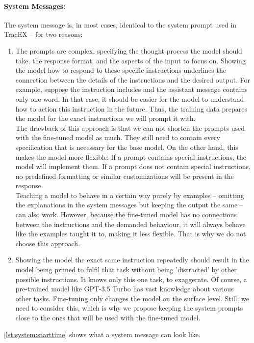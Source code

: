 \paragraph{System Messages:} The system message is, in most cases, identical to the system prompt used in TracEX – for two reasons:
\begin{enumerate}
    \item
        The prompts are complex, specifying the thought process the model should take, the response format, and the aspects of the input to focus on. Showing the model how to respond to these specific instructions underlines the connection between the details of the instructions and the desired output. For example, suppose the instruction includes  and the assistant message contains only one word. In that case, it should be easier for the model to understand how to action this instruction in the future. Thus, the training data prepares the model for the exact instructions we will prompt it with.\\
        The drawback of this approach is that we can not shorten the prompts used with the fine-tuned model as much. They still need to contain every specification that is necessary for the base model. On the other hand, this makes the model more flexible: If a prompt contains special instructions, the model will implement them. If a prompt does not contain special instructions, no predefined formatting or similar customizations will be present in the response.\\
        Teaching a model to behave in a certain way purely by examples – omitting the explanations in the system messages but keeping the output the same – can also work. However, because the fine-tuned model has no connections between the instructions and the demanded behaviour, it will always behave like the examples taught it to, making it less flexible. That is why we do not choose this approach.
    \item 
        Showing the model the exact same instruction repeatedly should result in the model being primed to fulfil that task without being 'distracted' by other possible instructions. It knows only this one task, to exaggerate. Of course, a pre-trained model like GPT-3.5 Turbo has vast knowledge about various other tasks. Fine-tuning only changes the model on the surface level. Still, we need to consider this, which is why we propose keeping the system prompts close to the ones that will be used with the fine-tuned model.
\end{enumerate}
\autoref{lst:system:starttime} shows what a system message can look like.

